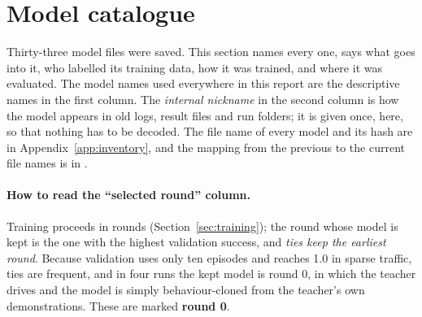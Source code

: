 \section{Model catalogue}\label{sec:catalogue}

\begin{plainwords}
Thirty-three model files were saved. This section names every one, says what goes into it, who labelled its training data, how it was trained, and where it was evaluated. The model names used everywhere in this report are the descriptive names in the first column. The \emph{internal nickname} in the second column is how the model appears in old logs, result files and run folders; it is given once, here, so that nothing has to be decoded. The file name of every model and its hash are in Appendix~\ref{app:inventory}, and the mapping from the previous to the current file names is in .
\end{plainwords}

\paragraph{How to read the ``selected round'' column.} Training proceeds in rounds (Section~\ref{sec:training}); the round whose model is kept is the one with the highest validation success, and \emph{ties keep the earliest round}. Because validation uses only ten episodes and reaches 1.0 in sparse traffic, ties are frequent, and in four runs the kept model is round 0, in which the teacher drives and the model is simply behaviour-cloned from the teacher's own demonstrations. These are marked \textbf{round 0}.

